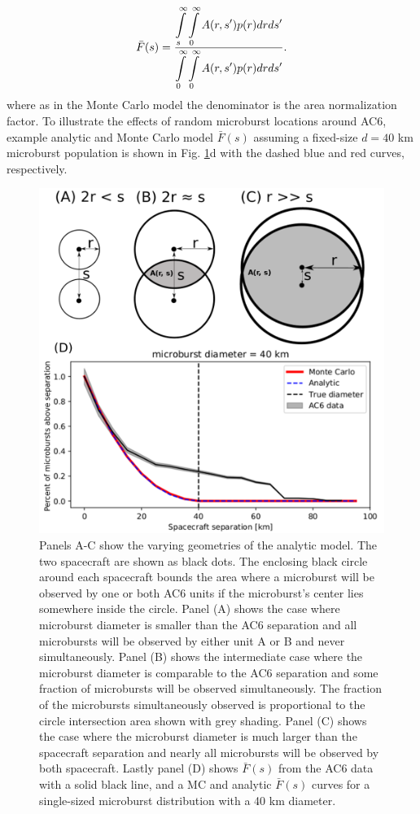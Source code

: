 \documentclass[draft]{agujournal2019}
\begin{document}
\begin{equation} \label{analytic_integral}
\bar{F}(s) = \frac{\displaystyle\int\displaylimits_{s}^{\infty} \displaystyle\int\displaylimits_0^{\infty} A(r, s') p(r) dr ds'}{\displaystyle\int\displaylimits_{0}^{\infty} \displaystyle\int\displaylimits_0^{\infty} A(r, s') p(r) dr ds'} .
\end{equation} where as in the Monte Carlo model the denominator is the area normalization factor. To illustrate the effects of random microburst locations around AC6, example analytic and Monte Carlo model $\bar{F}(s)$ assuming a fixed-size $d = 40$ km microburst population is shown in Fig. \ref{fig5}d with the dashed blue and red curves, respectively.

\begin{figure}
\includegraphics[width=\textwidth]{fig5.png}
\caption{Panels A-C show the varying geometries of the analytic model. The two spacecraft are shown as black dots. The enclosing black circle around each spacecraft bounds the area where a microburst will be observed by one or both AC6 units if the microburst's center lies somewhere inside the circle. Panel (A) shows the case where microburst diameter is smaller than the AC6 separation and all microbursts will be observed by either unit A or B and never simultaneously. Panel (B) shows the intermediate case where the microburst diameter is comparable to the AC6 separation and some fraction of microbursts will be observed simultaneously. The fraction of the microbursts simultaneously observed is proportional to the circle intersection area shown with grey shading. Panel (C) shows the case where the microburst diameter is much larger than the spacecraft separation and nearly all microbursts will be observed by both spacecraft. Lastly panel (D) shows $\bar{F}(s)$ from the AC6 data with a solid black line, and a MC and analytic $\bar{F}(s)$ curves for a single-sized microburst distribution with a 40 km diameter.} 
\label{fig5}
\end{figure}
\end{document}
